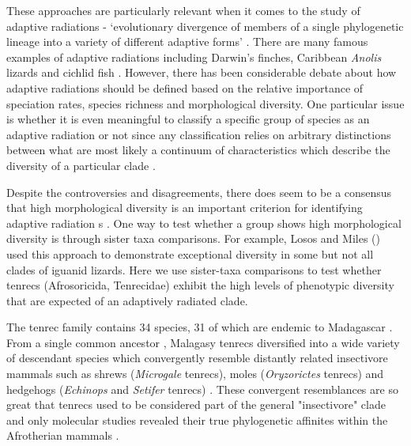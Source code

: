 \documentclass[12pt,a4paper]{article}
\begin{document}
	These approaches are particularly relevant when it comes to the study of adaptive radiations - `evolutionary divergence of members of a single phylogenetic lineage into a variety of different adaptive forms' \citep[Futuyma 1998, cited by][]{Losos2010}. 
	There are many famous examples of adaptive radiations including Darwin's finches, Caribbean \textit{Anolis} lizards and cichlid fish \citep{Gavrilets2009}. However, there has been considerable debate about how adaptive radiations should be defined \citep{Glor2010, Losos2010a} based on the relative importance of speciation rates, species richness and morphological diversity. One particular issue is whether it is even meaningful to classify a specific group of species as an adaptive radiation or not since any classification relies on arbitrary distinctions between what are most likely a continuum of characteristics which describe the diversity of a particular clade \citep{Olson2009}. %

	Despite the controversies and disagreements, there does seem to be a consensus that high morphological diversity is an important criterion for identifying adaptive radiation s \citep{Losos2010a, Olson2009}. One way to test whether a group shows high morphological diversity is through sister taxa comparisons. For example, Losos and Miles (\citeyear{Losos2002}) used this approach to demonstrate exceptional diversity in some but not all clades of iguanid lizards.
	Here we use sister-taxa comparisons to test whether tenrecs (Afrosoricida, Tenrecidae) exhibit the high levels of phenotypic diversity that are expected of an adaptively radiated clade.

	The tenrec family contains 34 species, 31 of which are endemic to Madagascar \citep{Olson2013}. From a single common ancestor \citep{Asher2006}, Malagasy tenrecs diversified into a wide variety of descendant species which convergently resemble distantly related insectivore mammals such as shrews (\textit{Microgale} tenrecs), moles (\textit{Oryzorictes} tenrecs) and hedgehogs (\textit{Echinops} and \textit{Setifer} tenrecs) \citep{Eisenberg1969}. These convergent resemblances are so great that tenrecs used to be considered part of the general "insectivore" clade and only molecular studies revealed their true phylogenetic affinites within the Afrotherian mammals \citep{Stanhope1998}.  
\end{document}
